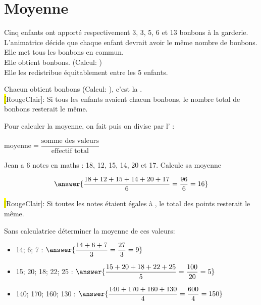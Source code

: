 \section{Moyenne}
\setcounter{exemple}{0}

\begin{exemplebox}
    Cinq enfants ont apporté respectivement 3, 3, 5, 6 et 13 bonbons à la
    garderie. L'animatrice décide que chaque enfant devrait avoir le même nombre
    de bonbons. Elle met tous les bonbons en commun. \\

    Elle obtient  bonbons. 
    (Calcul: )\\

    Elle les redistribue équitablement entre les 5 enfants.

    Chacun obtient  bonbons (Calcul: ), c'est la .\\

    \hl[RougeClair]{}: Si tous les enfants avaient
    chacun  bonbons, le nombre total de bonbons resterait le même.

\end{exemplebox}

\begin{definitionbox}
    Pour calculer la moyenne, on fait  puis on
    divise par l' :
    \begin{center}
        $\text{moyenne} = \dfrac{\text{somme des valeurs}}{\text{effectif
        total}} $
    \end{center}
\end{definitionbox}

\begin{exemplebox}
    Jean a 6 notes en maths : 18, 12, 15, 14, 20 et 17. Calcule sa moyenne

    $$\answer{\dfrac{18 + 12 + 15 + 14 + 20 + 17}{6} = \dfrac{96}{6} = 16}$$


    \hl[RougeClair]{}: Si toutes les notes étaient
    égales à , le total des points resterait le même.
\end{exemplebox}


\begin{exercicebox}
    Sans calculatrice déterminer la moyenne de ces valeurs:
    \begin{itemize}
        \item 14; 6; 7 : $\answer{\dfrac{14+6+7}{3}= \dfrac{27}{3} = 9}$
        \item 15; 20; 18; 22; 25 : $\answer{\dfrac{15 + 20 + 18 + 22 + 25}{5}=
            \dfrac{100}{20} = 5}  $
        \item 140; 170; 160; 130 : $\answer{\dfrac{140 + 170 + 160 + 130}{4} =
            \dfrac{600}{4} = 150}$
    \end{itemize}
\end{exercicebox}
